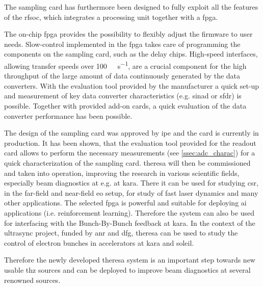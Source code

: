 The sampling card has furthermore been designed to fully exploit all the features of the \gls{rfsoc}, which integrates a processing unit together with a \gls{fpga}.

The on-chip \gls{fpga} provides the possibility to flexibly adjust the firmware to user needs. 
Slow-control implemented in the \gls{fpga} takes care of programming the components on the sampling card, such as the delay chips.
High-speed interfaces, allowing transfer speeds over \SI{100}{\giga\bits\per\second}, are a crucial component for the high throughput of the large amount of data continuously generated by the data converters.
With the evaluation tool provided by the manufacturer a quick set-up and measurement of key data converter characteristics (e.g. \gls{sinad} or \gls{sfdr}) is possible. 
Together with provided add-on cards, a quick evaluation of the data converter performance has been possible.  %

The design of the sampling card was approved by \gls{ipe} and the card is currently in production.
It has been shown, that the evaluation tool provided for the readout card allows to perform the necessary measurements (see \autoref{ssec:adc_charac}) for a quick characterization of the sampling card.
\gls{theresa} will then be commissioned and taken into operation, improving the research in various scientific fields, especially beam diagnostics at e.g. at \gls{kara}. 
There it can be used for studying \gls{csr}, in the far-field and near-field \gls{eo} setup, for study of fast laser dynamics and many other applications.
The selected \gls{fpga} is powerful and suitable for deploying \gls{ai} applications (i.e. reinforcement learning).
Therefore the system can also be used for interfacing with the Bunch-By-Bunch feedback at \gls{kara}.
In the context of the \gls{ultrasync} project, funded by \gls{anr} and \gls{dfg}, \gls{theresa} can be used to study the control of electron bunches in accelerators at \gls{kara} and \gls{soleil}. 

Therefore the newly developed \gls{theresa} system is an important step towards new usable \gls{thz} sources and can be deployed to improve beam diagnostics at several renowned sources. 
  

